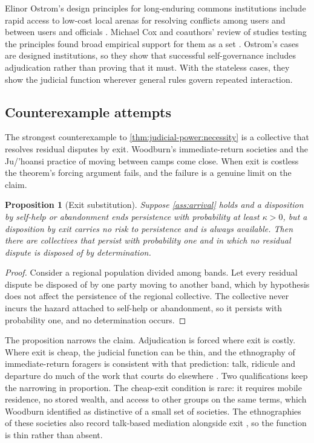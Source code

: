 \documentclass[11pt,letterpaper]{article}
\newtheorem{proposition}[theorem]{Proposition}
\theoremstyle{definition}
\theoremstyle{remark}
\begin{document}
Elinor Ostrom's design principles for long-enduring commons institutions include rapid access to low-cost local arenas for resolving conflicts among users and between users and officials \citep{ostrom1990}. Michael Cox and coauthors' review of studies testing the principles found broad empirical support for them as a set \citep{cox2010}. Ostrom's cases are designed institutions, so they show that successful self-governance includes adjudication rather than proving that it must. With the stateless cases, they show the judicial function wherever general rules govern repeated interaction.

\subsection{Counterexample attempts}

The strongest counterexample to \cref{thm:judicial-power:necessity} is a collective that resolves residual disputes by exit. Woodburn's immediate-return societies and the Ju/'hoansi practice of moving between camps come close. When exit is costless the theorem's forcing argument fails, and the failure is a genuine limit on the claim.

\begin{proposition}[Exit substitution]
\label{prop:judicial-power:exit}
Suppose \cref{ass:arrival} holds and a disposition by self-help or abandonment ends persistence with probability at least $\kappa>0$, but a disposition by exit carries no risk to persistence and is always available. Then there are collectives that persist with probability one and in which no residual dispute is disposed of by determination.
\end{proposition}

\begin{proof}
Consider a regional population divided among bands. Let every residual dispute be disposed of by one party moving to another band, which by hypothesis does not affect the persistence of the regional collective. The collective never incurs the hazard attached to self-help or abandonment, so it persists with probability one, and no determination occurs.
\end{proof}

The proposition narrows the claim. Adjudication is forced where exit is costly. Where exit is cheap, the judicial function can be thin, and the ethnography of immediate-return foragers is consistent with that prediction: talk, ridicule and departure do much of the work that courts do elsewhere \citep{woodburn1982,lee2013}. Two qualifications keep the narrowing in proportion. The cheap-exit condition is rare: it requires mobile residence, no stored wealth, and access to other groups on the same terms, which Woodburn identified as distinctive of a small set of societies. The ethnographies of these societies also record talk-based mediation alongside exit \citep{lee2013,wiessner2005}, so the function is thin rather than absent.
\end{document}
